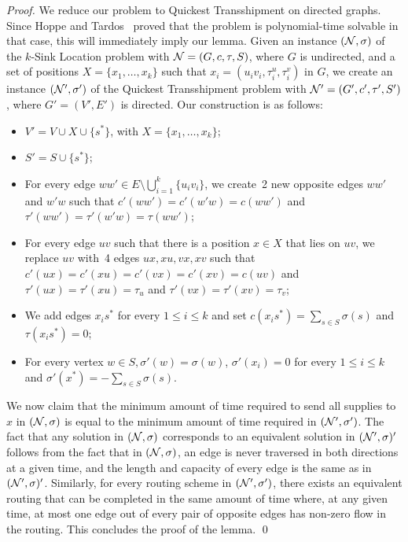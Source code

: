 \documentclass[a4paper,10pt]{llncs}
\begin{document}
\begin{proof}
We reduce our problem to {\sc Quickest Transshipment} on directed graphs. Since Hoppe and Tardos~\cite{HT00} proved that the problem is polynomial-time solvable in that case, this will immediately imply our lemma. Given an instance $({\cal N}, \sigma)$ of the $k$-{\sc Sink Location} problem with ${\cal N}=(G,c,\tau,S)$, where $G$ is undirected, and a set of positions $X=\{x_1,\ldots,x_k\}$ such that $x_i=(u_iv_i,\tau_i^u,\tau_i^v)$ in $G$, we create an instance $({\cal N}', \sigma')$ of the {\sc Quickest Transshipment} problem with ${\cal N}'=(G',c',\tau',S')$, where $G'=(V',E')$ is directed. Our construction is as follows:
\begin{itemize}
\item $V'=V \cup X \cup \{s^*\}$, with $X=\{x_1,\ldots,x_k\}$;
\item $S'=S\cup \{s^*\}$;
\item For every edge $ww'\in E\setminus \bigcup_{i=1}^k\{u_iv_i\}$, we create~2 new opposite edges $ww'$ and $w'w$ such that $c'(ww')=c'(w'w)=c(ww')$ and $\tau'(ww')=\tau'(w'w)=\tau(ww')$;
\item For every edge $uv$ such that there is a position $x\in X$ that lies on $uv$, we replace $uv$ with~4 edges $ux,xu,vx,xv$ such that $c'(ux)=c'(xu)=c'(vx)=c'(xv)=c(uv)$ and $\tau'(ux)=\tau'(xu)=\tau_u$ and $\tau'(vx)=\tau'(xv)=\tau_v$;
\item We add edges $x_is^*$ for every $1\leq i\leq k$ and set $c(x_is^*)=\sum_{s\in S}\sigma(s)$ and $\tau(x_is^*)=0$;
\item For every vertex $w\in S, \sigma'(w)=\sigma(w)$, $\sigma'(x_i)=0$ for every $1\leq i\leq k$ and $\sigma'(x^*)=-\sum_{s\in S}\sigma(s)$.
\end{itemize}
We now claim that the minimum amount of time required to send all supplies to $x$ in $({\cal N}, \sigma)$ is equal to the minimum amount of time required in $({\cal N}', \sigma')$.
The fact that any solution in $({\cal N}, \sigma)$ corresponds to an equivalent solution in $({\cal N}', \sigma)'$ follows from the fact that in $({\cal N}, \sigma)$, an edge is never traversed in both directions at a given time, and the length and capacity of every edge is the same as in $({\cal N}', \sigma)'$. Similarly, for every routing scheme in $({\cal N}', \sigma')$, there exists an equivalent routing that can be completed in the same amount of time where, at any given time, at most one edge out of every pair of opposite edges has non-zero flow in the routing. This concludes the proof of the lemma.
\qed
\end{proof}
\end{document}

